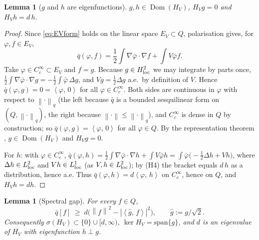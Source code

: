 \documentclass[11pt,a4paper]{article}
\theoremstyle{plain}
\newtheorem{lemma}[theorem]{Lemma}
\theoremstyle{definition}
\theoremstyle{remark}
\newcommand{\norm}[1]{\left\|#1\right\|}
\newcommand{\ip}[2]{\left\langle #1,\,#2\right\rangle}
\DeclareMathOperator{\Dom}{Dom}
\newcommand{\hg}{\hat g}
\begin{document}
\begin{lemma}[$g$ and $h$ are eigenfunctions]\label{lem:eig}
$g,h\in\Dom(H_V)$, $H_Vg=0$ and $H_Vh=d\,h$.
\end{lemma}

\begin{proof}
Since \eqref{eq:EVform} holds on the linear space $E_V\subset Q$, polarisation gives, for $\varphi,f\in E_V$,
\[
\bar q(\varphi,f)=\frac12\int\nabla\bar\varphi\cdot\nabla f+\int V\bar\varphi f .
\]
Take $\varphi\in C_c^\infty\subset E_V$ and $f=g$. Because $g\in H^2_{\rm loc}$ we may integrate by parts once, $\tfrac12\int\nabla\bar\varphi\cdot\nabla g=-\tfrac12\int\bar\varphi\,\Delta g$, and $Vg=\tfrac12\Delta g$ a.e.\ by definition of $V$. Hence $\bar q(\varphi,g)=0=\ip\varphi 0$ for all $\varphi\in C_c^\infty$. Both sides are continuous in $\varphi$ with respect to $\norm\cdot_q$ (the left because $\bar q$ is a bounded sesquilinear form on $(Q,\norm\cdot_q)$, the right because $\norm\cdot\le\norm\cdot_q$), and $C_c^\infty$ is dense in $Q$ by construction; so $\bar q(\varphi,g)=\ip\varphi0$ for all $\varphi\in Q$. By the representation theorem \cite[VI, Thm.~2.1(iii)]{Kato}, $g\in\Dom(H_V)$ and $H_Vg=0$.

For $h$: with $\varphi\in C_c^\infty$, $\bar q(\varphi,h)=\tfrac12\int\nabla\bar\varphi\cdot\nabla h+\int V\bar\varphi h=\int\bar\varphi\big(-\tfrac12\Delta h+Vh\big)$, where $\Delta h\in L^2_{\rm loc}$ and $Vh\in L^1_{\rm loc}$ (as $V,h\in L^2_{\rm loc}$); by (H4) the bracket equals $d\,h$ as a distribution, hence a.e. Thus $\bar q(\varphi,h)=d\ip\varphi h$ on $C_c^\infty$, hence on $Q$, and $H_Vh=dh$.
\end{proof}

\begin{lemma}[Spectral gap]\label{lem:gap}
For every $f\in Q$,
\begin{equation}\label{eq:Qgap}
\bar q[f]\;\ge\;d\big(\norm f^2-|\ip{\hg}{f}|^2\big),\qquad \hg:=g/\sqrt2 .
\end{equation}
Consequently $\sigma(H_V)\subset\{0\}\cup[d,\infty)$, $\ker H_V=\mathrm{span}\{g\}$, and $d$ is an eigenvalue of $H_V$ with eigenfunction $h\perp g$.
\end{lemma}
\end{document}
